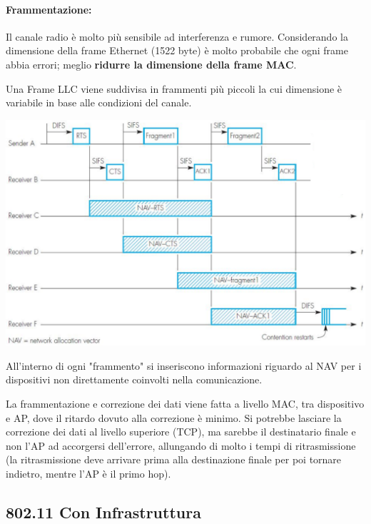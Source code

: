 \paragraph{Frammentazione:} Il canale radio è molto più sensibile ad interferenza e rumore. Considerando la dimensione della frame Ethernet (1522 byte) è molto probabile che ogni frame abbia errori; meglio \textbf{ridurre la dimensione della frame MAC}. 

Una Frame LLC viene suddivisa in frammenti più piccoli la cui dimensione è variabile in base alle condizioni del canale.
\begin{center}
	\includegraphics[width=0.9\linewidth]{img/wlan/frag}
\end{center}

All'interno di ogni "frammento" si inseriscono informazioni riguardo al NAV per i dispositivi non direttamente coinvolti nella comunicazione.

La frammentazione e correzione dei dati viene fatta a livello MAC, tra dispositivo e AP, dove il ritardo dovuto alla correzione è minimo. Si potrebbe lasciare la correzione dei dati al livello superiore (TCP), ma sarebbe il destinatario finale e non l'AP ad accorgersi dell'errore, allungando di molto i tempi di ritrasmissione (la ritrasmissione deve arrivare prima alla destinazione finale per poi tornare indietro, mentre l'AP è il primo hop).

\subsection{802.11 Con Infrastruttura}

